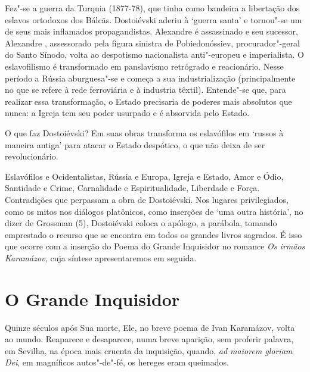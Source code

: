 Fez"-se a guerra da Turquia (1877-78), que tinha como bandeira a
libertação dos eslavos ortodoxos dos Bálcãs. Dostoiévski aderiu à
`guerra santa' e tornou"-se um de seus mais inflamados propagandistas.
Alexandre  é assassinado e seu sucessor, Alexandre , assessorado
pela figura sinistra de Pobiedonóssiev, procurador"-geral do Santo
Sínodo, volta ao despotismo nacionalista anti"-europeu e imperialista. O
eslavofilismo é transformado em panslavismo retrógrado e reacionário.
Nesse período a Rússia aburguesa"-se e começa a sua industrialização
(principalmente no que se refere à rede ferroviária e à industria
têxtil). Entende"-se que, para realizar essa transformação, o Estado
precisaria de poderes mais absolutos que nunca: a Igreja tem seu poder
usurpado e é absorvida pelo Estado.

O que faz Dostoiévski? Em suas obras transforma os eslavófilos em
`russos à maneira antiga' para atacar o Estado despótico, o que não
deixa de ser revolucionário.

Eslavófilos e Ocidentalistas, Rússia e Europa, Igreja e Estado, Amor e
Ódio, Santidade e Crime, Carnalidade e Espiritualidade, Liberdade e
Força. Contradições que perpassam a obra de Dostoiévski. Nos lugares
privilegiados, como os mitos nos diálogos platônicos, como inserções de
`uma outra história', no dizer de Grossman (5), Dostoiévski coloca o
apólogo, a parábola, tomando emprestado o recurso que se encontra em
todos os grandes livros sagrados. É isso que ocorre com a inserção do
Poema do Grande Inquisidor no romance \emph{Os irmãos Karamázov,} cuja
síntese apresentaremos em seguida.

\section{O Grande Inquisidor}

Quinze séculos após Sua morte, Ele, no breve poema de Ivan Karamázov,
volta ao mundo. Reaparece e desaparece, numa breve aparição, sem
proferir palavra, em Sevilha, na época mais cruenta da inquisição,
quando, \emph{ad maiorem gloriam Dei}, em magníficos autos"-de"-fé, os
hereges eram queimados.

